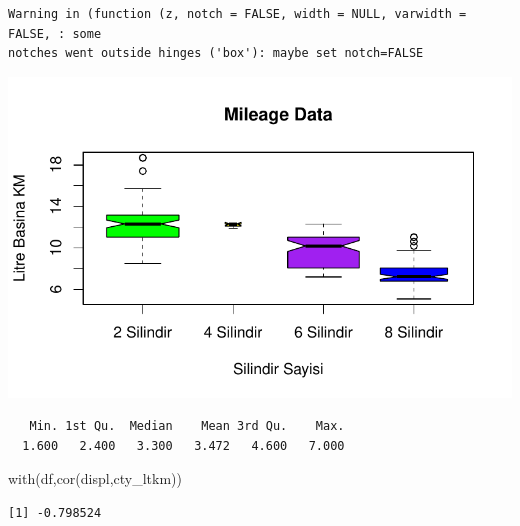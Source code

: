 \documentclass[
  letterpaper,
  DIV=11,
  numbers=noendperiod]{scrreprt}
\newenvironment{Shaded}{\begin{snugshade}}{\end{snugshade}}
\newcommand{\AttributeTok}[1]{\textcolor[rgb]{0.40,0.45,0.13}{#1}}
\newcommand{\CommentTok}[1]{\textcolor[rgb]{0.37,0.37,0.37}{#1}}
\newcommand{\FunctionTok}[1]{\textcolor[rgb]{0.28,0.35,0.67}{#1}}
\newcommand{\NormalTok}[1]{\textcolor[rgb]{0.00,0.23,0.31}{#1}}
\newcommand{\SpecialCharTok}[1]{\textcolor[rgb]{0.37,0.37,0.37}{#1}}
\newcommand{\StringTok}[1]{\textcolor[rgb]{0.13,0.47,0.30}{#1}}
\begin{document}
\begin{verbatim}
Warning in (function (z, notch = FALSE, width = NULL, varwidth = FALSE, : some
notches went outside hinges ('box'): maybe set notch=FALSE
\end{verbatim}

\includegraphics{data_analysis_files/figure-pdf/unnamed-chunk-2-7.pdf}

\begin{Shaded}
\end{Shaded}

\begin{verbatim}
   Min. 1st Qu.  Median    Mean 3rd Qu.    Max. 
  1.600   2.400   3.300   3.472   4.600   7.000 
\end{verbatim}

\begin{Shaded}
\begin{Highlighting}[]
\FunctionTok{with}\NormalTok{(df,}\FunctionTok{cor}\NormalTok{(displ,cty\_ltkm))}
\end{Highlighting}
\end{Shaded}

\begin{verbatim}
[1] -0.798524
\end{verbatim}

\begin{Shaded}
\end{Shaded}
\end{document}
